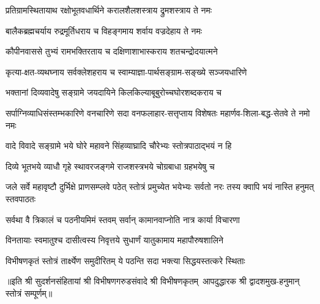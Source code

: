 \twolineshloka
{प्रतिग्रामस्थितायाथ रक्षोभूतवधार्थिने}
{करालशैलशस्त्राय द्रुमशस्त्राय ते नमः}

\twolineshloka
{बालैकब्रह्मचर्याय रुद्रमूर्तिधराय च}
{विहङ्गमाय शर्वाय वज्रदेहाय ते नमः}

\twolineshloka
{कौपीनवाससे तुभ्यं रामभक्तिरताय च}
{दक्षिणाशाभास्कराय शतचन्द्रोदयात्मने}

\twolineshloka
{कृत्या-क्षत-व्यथघ्नाय सर्वक्लेशहराय च}
{स्वाम्याज्ञा-पार्थसङ्ग्राम-सङ्ख्ये सञ्जयधारिणे}

\twolineshloka
{भक्तानां दिव्यवादेषु सङ्ग्रामे जयदायिने}
{किलकिल्याबूबुरोच्चघोरशब्दकराय च}

\threelineshloka
{सर्पाग्निव्याधिसंस्तम्भकारिणे वनचारिणे}
{सदा वनफलाहार-सत्तृप्ताय विशेषतः}
{महार्णव-शिला-बद्ध-सेतवे ते नमो नमः}

\twolineshloka
{वादे विवादे सङ्ग्रामे भये घोरे महावने}
{सिंहव्याघ्रादि चौरेभ्यः स्तोत्रपाठाद्भयं न हि}

\twolineshloka
{दिव्ये भूतभये व्याधौ गृहे स्थावरजङ्गमे}
{राजशस्त्रभये चोग्रबाधा ग्रहभयेषु च}

\threelineshloka
{जले सर्वे महावृष्टौ दुर्भिक्षे प्राणसम्प्लवे}
{पठेत् स्तोत्रं प्रमुच्येत भयेभ्यः सर्वतो नरः}
{तस्य क्वापि भयं नास्ति हनुमत् स्तवपाठतः}

\twolineshloka
{सर्वथा वै त्रिकालं च पठनीयमिमं स्तवम्}
{सर्वान् कामानवाप्नोति नात्र कार्या विचारणा}

\twolineshloka
{विनतायाः स्वमातुश्च दासीत्वस्य निवृत्तये}
{सुधार्णं यातुकामाय महापौरुषशालिने}

\twolineshloka
{विभीषणकृतं स्तोत्रं तार्क्ष्येण समुदीरितम्}
{ये पठन्ति सदा भक्त्या सिद्धयस्तत्करे स्थिताः}

॥इति श्री सुदर्शनसंहितायां श्री विभीषणगरुडसंवादे श्री विभीषणकृतम्~आपदुद्धारक श्री द्वादशमुख-हनुमान् स्तोत्रं सम्पूर्णम्॥
